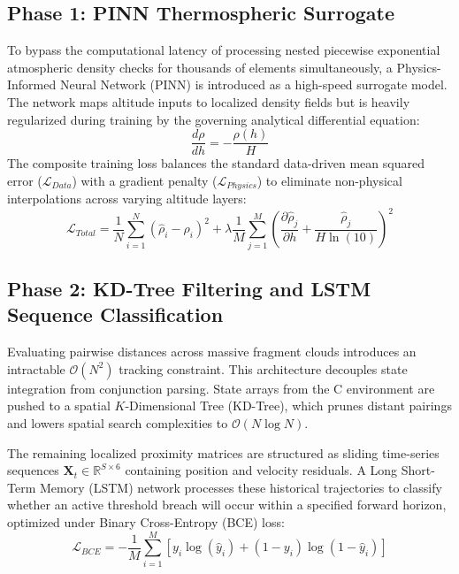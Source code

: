 \documentclass[conf]{AAS} %
\begin{document}
\subsection{Phase 1: PINN Thermospheric Surrogate}
To bypass the computational latency of processing nested piecewise exponential atmospheric density checks for thousands of elements simultaneously, a Physics-Informed Neural Network (PINN) is introduced as a high-speed surrogate model. The network maps altitude inputs to localized density fields but is heavily regularized during training by the governing analytical differential equation:
\begin{equation}
    \frac{d\rho}{dh} = -\frac{\rho(h)}{H}
\end{equation}
The composite training loss balances the standard data-driven mean squared error ($\mathcal{L}_{Data}$) with a gradient penalty ($\mathcal{L}_{Physics}$) to eliminate non-physical interpolations across varying altitude layers:
\begin{equation}
    \mathcal{L}_{Total} = \frac{1}{N} \sum_{i=1}^{N} (\hat{\rho}_i - \rho_i)^2 + \lambda \frac{1}{M} \sum_{j=1}^{M} \left( \frac{\partial \hat{\rho}_j}{\partial h} + \frac{\hat{\rho}_j}{H \ln(10)} \right)^2
\end{equation}

\subsection{Phase 2: KD-Tree Filtering and LSTM Sequence Classification}
Evaluating pairwise distances across massive fragment clouds introduces an intractable $\mathcal{O}(N^2)$ tracking constraint. This architecture decouples state integration from conjunction parsing. State arrays from the C environment are pushed to a spatial $K$-Dimensional Tree (KD-Tree), which prunes distant pairings and lowers spatial search complexities to $\mathcal{O}(N \log N)$. 

The remaining localized proximity matrices are structured as sliding time-series sequences $\mathbf{X}_t \in \mathbb{R}^{S \times 6}$ containing position and velocity residuals. A Long Short-Term Memory (LSTM) network processes these historical trajectories to classify whether an active threshold breach will occur within a specified forward horizon, optimized under Binary Cross-Entropy (BCE) loss:
\begin{equation}
    \mathcal{L}_{BCE} = -\frac{1}{M} \sum_{i=1}^{M} \left[ y_i \log(\hat{y}_i) + (1 - y_i) \log(1 - \hat{y}_i) \right]
\end{equation}
\end{document}
